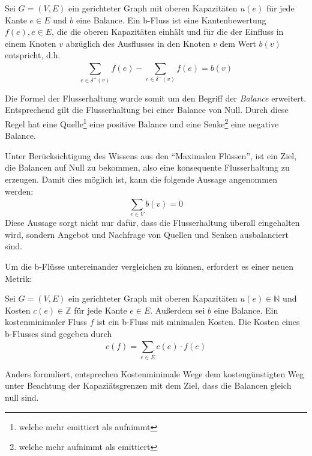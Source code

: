 \begin{definition}
    Sei $G = (V,E)$ ein gerichteter Graph mit oberen Kapazitäten $u(e)$ für jede Kante $e \in E$ und $b$ eine Balance. Ein b-Fluss ist eine Kantenbewertung $f(e), e \in E$, die die oberen Kapazitäten einhält und für die der Einfluss in einem Knoten $v$ abzüglich des Ausflusses in den Knoten $v$ dem Wert $b(v)$ entspricht, d.h. 
    \begin{equation}
        \displaystyle\sum_{e \in \delta ^{+} (v)}^{} f(e) - \displaystyle\sum_{e \in \delta ^{-} (v)}^{} f(e) = b(v)
    \end{equation}
\end{definition}

Die Formel der Flusserhaltung wurde somit um den Begriff der \textit{Balance} erweitert. Entsprechend gilt die Flusserhaltung bei einer Balance von Null. Durch diese Regel hat eine Quelle\footnote{welche mehr emittiert als aufnimmt} eine positive Balance und eine Senke\footnote{welche mehr aufnimmt als emittiert} eine negative Balance.

Unter Berücksichtigung des Wissens aus den \enquote{Maximalen Flüssen}, ist ein Ziel, die Balancen auf Null zu bekommen, also eine konsequente Flusserhaltung zu erzeugen. Damit dies möglich ist, kann die folgende Aussage angenommen werden:
\begin{equation*}
    \displaystyle\sum_{v \in V}^{} b(v) = 0
\end{equation*}
Diese Aussage sorgt nicht nur dafür, dass die Flusserhaltung überall eingehalten wird, sondern Angebot und Nachfrage von Quellen und Senken ausbalanciert sind.

Um die b-Flüsse untereinander vergleichen zu können, erfordert es einer neuen Metrik:

\begin{definition}
    Sei $G = (V,E)$ ein gerichteter Graph mit oberen Kapazitäten $u(e) \in \mathbb{N}$ und Kosten $c(e) \in \mathbb{Z}$ für jede Kante $e \in E$. Außerdem sei $b$ eine Balance. Ein kostenminimaler Fluss $f$ ist ein b-Fluss mit minimalen Kosten. Die Kosten eines b-Flusses sind gegeben durch
    \begin{equation}
        c(f) = \displaystyle\sum_{e \in E}^{} c(e) \cdot f(e)
    \end{equation}
\label{def:costfunktion}
\end{definition}

Anders formuliert, entsprechen Kostenminimale Wege dem kostengünstigten Weg unter Beachtung der Kapaziätsgrenzen mit dem Ziel, dass die Balancen gleich null sind.

